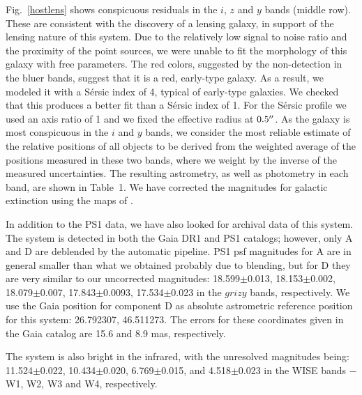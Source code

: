 \documentclass[manuscript]{aastex}
\begin{document}
Fig.~\ref{hostlens} shows conspicuous residuals in the $i$, $z$ and $y$ bands (middle row). These are consistent with the discovery of a lensing galaxy, in support of the lensing nature of this system. Due to the relatively low signal to noise ratio and the proximity of the point sources, we were unable to fit the morphology of this galaxy with free parameters. The red colors, suggested by the non-detection in the bluer bands, suggest that it is a red, early-type galaxy. As a result, we modeled it with a S{\'e}rsic index of 4, typical of early-type galaxies. We checked that this produces a better fit than a S{\'e}rsic index of 1. For the S{\'e}rsic profile we used an axis ratio of 1 and we fixed the effective radius at $0.5\mbox{$^{\prime\prime}$}$. As the galaxy is most conspicuous in the $i$ and $y$ bands, we consider the most reliable estimate of the relative positions of all objects to be derived from the weighted average of the positions measured in these two bands, where we weight by the inverse of the measured uncertainties. The resulting astrometry, as well as photometry in each band, are shown in Table~1. We have corrected the magnitudes for galactic extinction using the maps of \citet{sch11}.

In addition to the PS1 data, we have also looked for archival data of this system. The system is detected in both the Gaia \citep{gaia} DR1 and PS1 catalogs; however, only A and D are deblended by the automatic pipeline. PS1 psf magnitudes for A are in general smaller than what we obtained probably due to blending, but for D they are very similar to our uncorrected magnitudes: 18.599$\pm$0.013,  18.153$\pm$0.002,  18.079$\pm$0.007,  17.843$\pm$0.0093,  17.534$\pm$0.023 in the $grizy$ bands, respectively. We use the Gaia position for component D as absolute astrometric reference position for this system: 26.792307, 46.511273. The errors for these coordinates given in the Gaia catalog are 15.6 and 8.9 mas, respectively.


The system is also bright in the infrared, with the unresolved magnitudes being: 11.524$\pm$0.022, 10.434$\pm$0.020, 6.769$\pm$0.015, and 4.518$\pm$0.023 in the WISE bands $-$ W1, W2, W3 and W4, respectively. 
\end{document}
